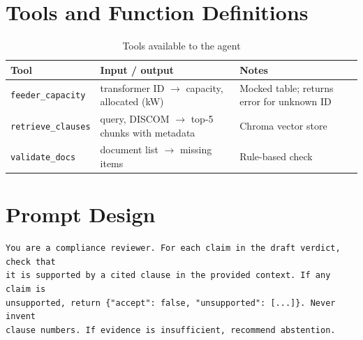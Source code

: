 \documentclass[12pt,a4paper,oneside]{report}
\newif\ifguidance
\newcommand{\guide}[1]{%
  \ifguidance
  \begin{tcolorbox}[enhanced,breakable,colback=guidebg,colframe=bmsblue,
    boxrule=0.6pt,arc=2pt,left=6pt,right=6pt,top=4pt,bottom=4pt,
    fonttitle=\bfseries\small,title={What to write here},
    before upper={\small\setstretch{1.1}}]
  #1
  \end{tcolorbox}
  \fi}
\newcommand{\dodont}[2]{%
  \ifguidance
  \begin{tcolorbox}[enhanced,breakable,sidebyside,sidebyside align=top seam,
    colback=dobg,colbacklower=dontbg,colframe=gray!60,boxrule=0.5pt,arc=2pt,
    lefthand ratio=0.5,left=5pt,right=5pt,top=4pt,bottom=4pt,
    fontupper=\small\setstretch{1.05},fontlower=\small\setstretch{1.05}]
  \textbf{\textcolor{ForestGreen}{\checkmark\ Do}}
  \begin{itemize}[leftmargin=12pt,itemsep=1pt,topsep=2pt]#1\end{itemize}
  \tcblower
  \textbf{\textcolor{BrickRed}{$\times$ Don't}}
  \begin{itemize}[leftmargin=12pt,itemsep=1pt,topsep=2pt]#2\end{itemize}
  \end{tcolorbox}
  \fi}
\newenvironment{sample}
  {\par\noindent{\footnotesize\bfseries\textcolor{BrickRed}{[SAMPLE --- replace with your own content]}}\par\color{samplecol}}
  {\par\medskip}
\begin{document}
\section{Tools and Function Definitions}
\guide{For each tool give its name, purpose, input schema, output schema and error handling. Mocked
tools must be identified as mocked.}
\dodont{\item Present tools in a table.
\item Describe the error behaviour.
}
{\item Do not hide that a tool is mocked.
}

\begin{sample}
\begin{table}[H]
\centering
\caption{Tools available to the agent}
\small
\begin{tabularx}{\linewidth}{@{}l X X@{}}
\toprule
\textbf{Tool} & \textbf{Input / output} & \textbf{Notes} \\ \midrule
\texttt{feeder\_capacity} & transformer ID $\rightarrow$ capacity, allocated (kW) & Mocked table; returns error for unknown ID \\
\texttt{retrieve\_clauses} & query, DISCOM $\rightarrow$ top-5 chunks with metadata & Chroma vector store \\
\texttt{validate\_docs} & document list $\rightarrow$ missing items & Rule-based check \\
\bottomrule
\end{tabularx}
\end{table}
\end{sample}


\section{Prompt Design}
\guide{Show the system prompt of each agent (shortened if long) in a listing or in Appendix~D, and
explain the key instructions, such as the output schema, citation rules and abstention rules.}
\dodont{\item Explain why each instruction is there.
\item Mention prompt revisions that changed behaviour.
}
{\item Do not include API keys or personal data in prompts shown.
}

\begin{sample}
\begin{lstlisting}[language={},numbers=none,caption={Reflector system prompt (shortened, sample)}]
You are a compliance reviewer. For each claim in the draft verdict, check that
it is supported by a cited clause in the provided context. If any claim is
unsupported, return {"accept": false, "unsupported": [...]}. Never invent
clause numbers. If evidence is insufficient, recommend abstention.
\end{lstlisting}
\end{sample}
\end{document}
